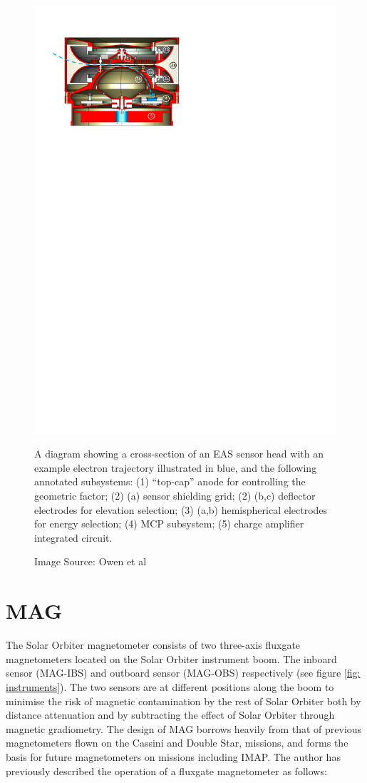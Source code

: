 \begin{figure}[h!]
    \centering
    \includegraphics[width=0.75\linewidth]{figures/eas_cross-section.pdf}
    \caption{A diagram showing a cross-section of an EAS sensor head with an example electron trajectory illustrated in blue, and the following annotated subsystems\cite{owen2020}: (1) “top-cap” anode for controlling the geometric factor; (2) (a) sensor shielding grid; (2) (b,c) deflector electrodes for elevation selection; (3) (a,b) hemispherical electrodes for energy selection; (4) MCP subsystem; (5) charge amplifier integrated circuit.}
    \caption*{Image Source: Owen et al\cite{owen2020}}
    \label{fig: EAS cross-section}
\end{figure}

\section{MAG}
The Solar Orbiter magnetometer consists of two three-axis fluxgate magnetometers located on the Solar Orbiter instrument boom. The inboard sensor (MAG-IBS) and outboard sensor (MAG-OBS) respectively (see figure \ref{fig: instruments}).  The two sensors are at different positions along the boom to minimise the risk of magnetic contamination by the rest of Solar Orbiter both by distance attenuation and by subtracting the effect of Solar Orbiter through magnetic gradiometry. The design of MAG borrows heavily from that of previous magnetometers flown on the Cassini\cite{dougherty2004} and Double Star\cite{carr2005}, missions, and forms the basis for future magnetometers on missions including IMAP\cite{mccomas2018}\cite{dickson2024}. The author has previously described the operation of a fluxgate magnetometer as follows\cite{dickson2024}: 

